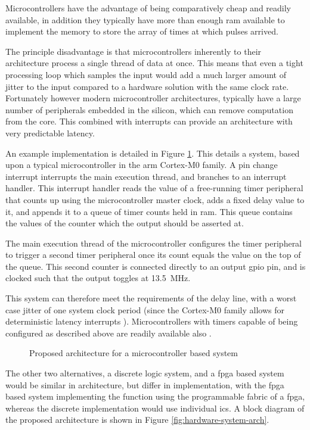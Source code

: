 Microcontrollers have the advantage of being comparatively cheap and readily available, in addition they typically have more than enough \gls{ram} available to implement the memory to store the array of times at which pulses arrived.

The principle disadvantage is that microcontrollers inherently to their architecture process a single thread of data at once. This means that even a tight processing loop which samples the input would add a much larger amount of jitter to the input compared to a hardware solution with the same clock rate. Fortunately however modern microcontroller architectures, typically have a large number of peripherals embedded in the silicon, which can remove computation from the core. This combined with interrupts can provide an architecture with very predictable latency.

An example implementation is detailed in Figure \ref{fig:mcu-system-arch}. This details a system, based upon a typical microcontroller in the \gls{arm} Cortex-M0 family. A pin change interrupt interrupts the main execution thread, and branches to an interrupt handler. This interrupt handler reads the value of a free-running timer peripheral that counts up using the microcontroller master clock, adds a fixed delay value to it, and appends it to a queue of timer counts held in \gls{ram}. This queue contains the values of the counter which the output should be asserted at.

The main execution thread of the microcontroller configures the timer peripheral to trigger a second timer peripheral once its count equals the value on the top of the queue. This second counter is connected directly to an output \gls{gpio} pin, and is clocked such that the output toggles at \SI{13.5}{\mega\hertz}.

This system can therefore meet the requirements of the delay line, with a worst case jitter of one system clock period (since the Cortex-M0 family allows for deterministic latency interrupts ). Microcontrollers with timers capable of being configured as described above are readily available also .

\begin{figure}[ht]
	\centering
	\dummyfigure
	\caption{Proposed architecture for a microcontroller based system}
	\label{fig:mcu-system-arch}
\end{figure}

The other two alternatives, a discrete logic system, and a \gls{fpga} based system would be similar in architecture, but differ in implementation, with the \gls{fpga} based system implementing the function using the programmable fabric of a \gls{fpga}, whereas the discrete implementation would use individual \glspl{ic}. A block diagram of the proposed architecture is shown in Figure \ref{fig:hardware-system-arch}.

